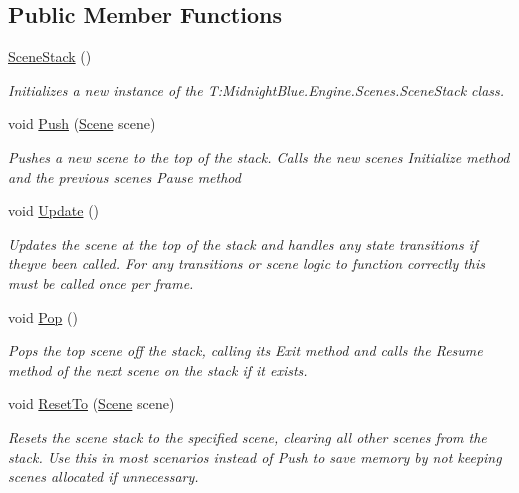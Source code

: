 \subsection*{Public Member Functions}
\begin{DoxyCompactItemize}
\item 
\hyperlink{class_midnight_blue_1_1_engine_1_1_scenes_1_1_scene_stack_a542204ca696d4acd37a0912043e38fa0}{Scene\+Stack} ()
\begin{DoxyCompactList}\small\item\em Initializes a new instance of the T\+:\+Midnight\+Blue.\+Engine.\+Scenes.\+Scene\+Stack class. \end{DoxyCompactList}\item 
void \hyperlink{class_midnight_blue_1_1_engine_1_1_scenes_1_1_scene_stack_ac98c028592de2bbaad1babf63bfa1aa3}{Push} (\hyperlink{class_midnight_blue_1_1_engine_1_1_scenes_1_1_scene}{Scene} scene)
\begin{DoxyCompactList}\small\item\em Pushes a new scene to the top of the stack. Calls the new scenes Initialize method and the previous scenes Pause method \end{DoxyCompactList}\item 
void \hyperlink{class_midnight_blue_1_1_engine_1_1_scenes_1_1_scene_stack_a440c1403c5992a98a7f9fb9feb8849cc}{Update} ()
\begin{DoxyCompactList}\small\item\em Updates the scene at the top of the stack and handles any state transitions if they\textquotesingle{}ve been called. For any transitions or scene logic to function correctly this must be called once per frame. \end{DoxyCompactList}\item 
void \hyperlink{class_midnight_blue_1_1_engine_1_1_scenes_1_1_scene_stack_a8c0ab363d287940ce8a66d1ab1356714}{Pop} ()
\begin{DoxyCompactList}\small\item\em Pops the top scene off the stack, calling its Exit method and calls the Resume method of the next scene on the stack if it exists. \end{DoxyCompactList}\item 
void \hyperlink{class_midnight_blue_1_1_engine_1_1_scenes_1_1_scene_stack_a8bddd32efa3f6133aa3899a164160431}{Reset\+To} (\hyperlink{class_midnight_blue_1_1_engine_1_1_scenes_1_1_scene}{Scene} scene)
\begin{DoxyCompactList}\small\item\em Resets the scene stack to the specified scene, clearing all other scenes from the stack. Use this in most scenarios instead of Push to save memory by not keeping scenes allocated if unnecessary. \end{DoxyCompactList}\item 

\end{DoxyCompactItemize}
